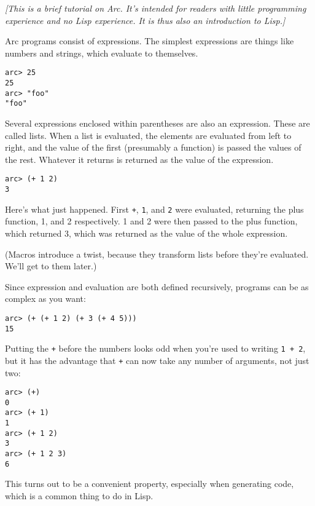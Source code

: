 \documentclass[a4paper,12pt]{book}
\begin{document}
\thispagestyle{empty}

{\em [This is a brief tutorial on {\sc{}Arc}.  It's intended for readers with
little programming experience and no {\sc{}Lisp} experience.  It is thus
also an introduction to {\sc{}Lisp}.]}

\bigskip
\bigskip

{\sc{}Arc} programs consist of expressions.  The simplest expressions are
things like numbers and strings, which evaluate to themselves.

\begin{verbatim}
arc> 25
25
arc> "foo"
"foo"
\end{verbatim}

Several expressions enclosed within parentheses are also an expression.
These are called lists.  When a list is evaluated, the elements are
evaluated from left to right, and the value of the first (presumably
a function) is passed the values of the rest.  Whatever it returns
is returned as the value of the expression.

\begin{verbatim}
arc> (+ 1 2)
3
\end{verbatim}

Here's what just happened.  First {\tt+}, {\tt1}, and {\tt2} were evaluated,
returning the plus function, 1, and 2 respectively.  1 and 2 were
then passed to the plus function, which returned 3, which was
returned as the value of the whole expression.

(Macros introduce a twist, because they transform lists before 
they're evaluated.  We'll get to them later.)

Since expression and evaluation are both defined recursively, 
programs can be as complex as you want:

\begin{verbatim}
arc> (+ (+ 1 2) (+ 3 (+ 4 5)))
15
\end{verbatim}

Putting the {\tt+} before the numbers looks odd when you're used to
writing \verb|1 + 2|, but it has the advantage that {\tt+} can now take any
number of arguments, not just two:

\begin{verbatim}
arc> (+)
0
arc> (+ 1) 
1
arc> (+ 1 2)
3
arc> (+ 1 2 3)
6
\end{verbatim}

This turns out to be a convenient property, especially when generating
code, which is a common thing to do in {\sc{}Lisp}.
\end{document}
